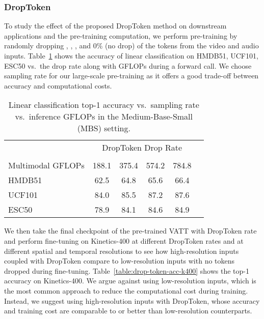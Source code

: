 \documentclass[10pt,twocolumn,letterpaper]{article}
\newcommand{\ours}{VATT\xspace}
\begin{document}
\subsubsection{DropToken}
To study the effect of the proposed DropToken method on downstream applications and the pre-training computation, we perform pre-training by randomly dropping , , , and 0\% (no drop) of the tokens from the video and audio inputs. Table~\ref{table:drop-token-acc-pre-train} shows the accuracy of linear classification on HMDB51, UCF101, ESC50 vs.\ the drop rate along with GFLOPs during a forward call. We choose  sampling rate for our large-scale pre-training as it offers a good trade-off between accuracy and computational costs.
\begin{table}[h!]
    \small
    \centering
    \setlength{\tabcolsep}{3pt}
    \begin{tabular}{@{}lccccc@{}}
    \toprule
    & \multicolumn{4}{c}{DropToken Drop Rate} \\
    \cline{2-5}
     &  &  &  &  \\
    \midrule
    Multimodal GFLOPs & 188.1 & 375.4 & 574.2 & 784.8 \\
    \midrule
    HMDB51 & 62.5 & 64.8 & 65.6 & 66.4 \\
    UCF101 & 84.0 & 85.5 & 87.2 & 87.6 \\
    ESC50  & 78.9 & 84.1 & 84.6 & 84.9 \\
    \bottomrule
    \end{tabular}
    \vspace{2mm}
    \caption{Linear classification top-1 accuracy vs.\ sampling rate vs.\ inference GFLOPs in the Medium-Base-Small (MBS) setting.}
    \label{table:drop-token-acc-pre-train}
    \vspace{-2mm}
\end{table} 
We then take the final checkpoint of the pre-trained \ours with  DropToken rate and perform fine-tuning on Kinetics-400 at different DropToken rates and at different spatial and temporal resolutions to see how high-resolution inputs coupled with DropToken compare to low-resolution inputs with no tokens dropped during fine-tuning. Table~\ref{table:drop-token-acc-k400} shows the top-1 accuracy on Kinetics-400. We argue against using low-resolution inputs, which is the most common approach to reduce the computational cost during training. Instead, we suggest using high-resolution inputs with DropToken, whose accuracy and training cost are comparable to or better than low-resolution counterparts.
\end{document}
